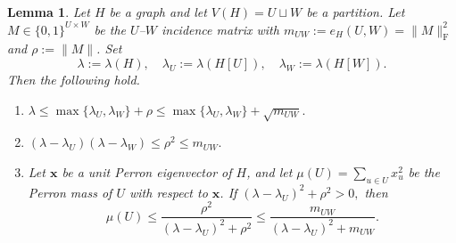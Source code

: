 \documentclass[10pt,a4paper]{amsart}
\newtheorem{lemma}[theorem]{Lemma}
\begin{document}
\begin{lemma}
\label{lem:spectral-vertex-cut}
Let \(H\) be a graph and let \(V(H)=U\sqcup W\) be a partition.
Let \(M\in\{0,1\}^{U\times W}\) be the \(U\)--\(W\) incidence matrix with $ m_{UW}:=e_H(U,W)=\|M\|_{\mathrm F}^2$ and  
$\rho:=\|M\|$. Set
\[ \lambda:=\lambda(H),
        \quad
        \lambda_U:=\lambda(H[U]),
        \quad
        \lambda_W:=\lambda(H[W]).
\]
Then the following hold.
\begin{enumerate}
  \item[\rm(a)] $\lambda
        \le
        \max\{\lambda_U,\lambda_W\}+\rho
        \le
        \max\{\lambda_U,\lambda_W\}+\sqrt{m_{UW}}.$

  \item[\rm(b)]
        $(\lambda-\lambda_U)(\lambda-\lambda_W)
        \le
        \rho^2
        \le
        m_{UW}.$

  \item[\rm(c)]
  Let \(\bm{x}\) be a unit Perron eigenvector of \(H\), and let
  \(\mu(U)=\sum_{u\in U}x_u^2\) be the Perron mass of \(U\) with respect
  to \(\bm{x}\).  If $(\lambda-\lambda_U)^2+\rho^2>0,$
  then
  \[
        \mu(U)
        \le
        \frac{\rho^2}{(\lambda-\lambda_U)^2+\rho^2}
        \le
        \frac{m_{UW}}{(\lambda-\lambda_U)^2+m_{UW}}.
  \]
\end{enumerate}
\end{lemma}
\end{document}
